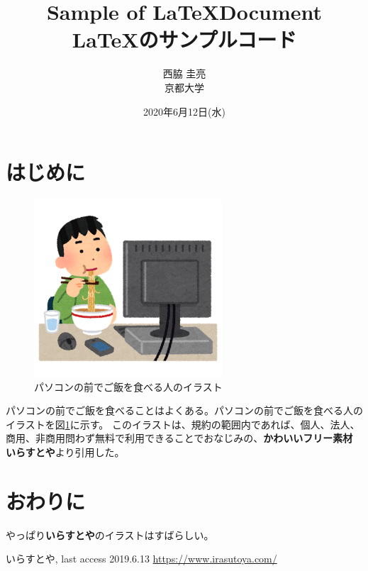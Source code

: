 \documentclass[uplatex, twocolumn,10pt]{jsarticle}
\begin{document}
\title{\bf{\LARGE{Sample of \LaTeX  Document} \\ \Large{\LaTeX のサンプルコード}}}
\author{西脇 圭亮\\京都大学}
\date{2020年6月12日(水)}
\maketitle


\section{はじめに}
\begin{figure}[t]
    \begin{center}
        \includegraphics[width=7cm]{images/syokuji_computer.png}
        \caption{パソコンの前でご飯を食べる人のイラスト}
        \label{fig:syokuji_computer}
    \end{center}
\end{figure}

パソコンの前でご飯を食べることはよくある。パソコンの前でご飯を食べる人のイラストを図\ref{fig:syokuji_computer}に示す。
このイラストは、規約の範囲内であれば、個人、法人、商用、非商用問わず無料で利用できることでおなじみの、{\bf かわいいフリー素材 いらすとや}\cite{irasutoya}より引用した。

\section{おわりに}
やっぱり{\bf いらすとや}のイラストはすばらしい。

\begin{thebibliography}{99}
     いらすとや, last access 2019.6.13 \url{https://www.irasutoya.com/}



\end{thebibliography}
\end{document}
